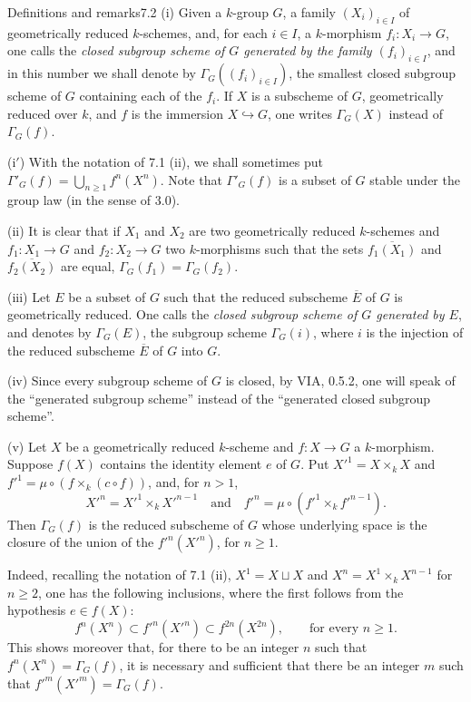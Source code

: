 \begin{enoncerm}{Definitions and remarks}{7.2}\label{VIB.7.2}
(i) Given a $k$-group $G$, a family $(X_i)_{i\in I}$ of geometrically reduced $k$-schemes, and, for each $i\in I$, a $k$-morphism $f_i:X_i\to G$, one calls the \emph{closed subgroup scheme of $G$ generated by the family $(f_i)_{i\in I}$}, and in this number we shall denote by $\Gamma_G((f_i)_{i\in I})$, the smallest closed subgroup scheme of $G$ containing each of the $f_i$. If $X$ is a subscheme of $G$, geometrically reduced over $k$, and $f$ is the immersion $X\hookrightarrow G$, one writes $\Gamma_G(X)$ instead of $\Gamma_G(f)$.

(i$'$) With the notation of 7.1 (ii), we shall sometimes put $\Gamma'_G(f)=\bigcup_{n\ge1}f^n(X^n)$. Note that $\Gamma'_G(f)$ is a subset of $G$ stable under the group law (in the sense of 3.0).

(ii) It is clear that if $X_1$ and $X_2$ are two geometrically reduced $k$-schemes and $f_1:X_1\to G$ and $f_2:X_2\to G$ two $k$-morphisms such that the sets $\overline{f_1(X_1)}$ and $\overline{f_2(X_2)}$ are equal, $\Gamma_G(f_1)=\Gamma_G(f_2)$.

(iii) Let $E$ be a subset of $G$ such that the reduced subscheme $\overline E$ of $G$ is geometrically reduced. One calls the \emph{closed subgroup scheme of $G$ generated by $E$}, and denotes by $\Gamma_G(E)$, the subgroup scheme $\Gamma_G(i)$, where $i$ is the injection of the reduced subscheme $\overline E$ of $G$ into $G$.

(iv) Since every subgroup scheme of $G$ is closed, by VIA, 0.5.2, one will speak of the ``generated subgroup scheme'' instead of the ``generated closed subgroup scheme''.

(v) Let $X$ be a geometrically reduced $k$-scheme and $f:X\to G$ a $k$-morphism. Suppose $f(X)$ contains the identity element $e$ of $G$. Put $X'^1=X\times_kX$ and $f'^1=\mu\circ(f\times_k(c\circ f))$, and, for $n>1$,
\[
X'^n=X'^1\times_kX'^{n-1}\quad\text{and}\quad f'^n=\mu\circ(f'^1\times_kf'^{n-1}).
\]
Then $\Gamma_G(f)$ is the reduced subscheme of $G$ whose underlying space is the closure of the union of the $f'^n(X'^n)$, for $n\ge1$.

Indeed, recalling the notation of 7.1 (ii), $X^1=X\sqcup X$ and $X^n=X^1\times_kX^{n-1}$ for $n\ge2$, one has the following inclusions, where the first follows from the hypothesis $e\in f(X)$:
\[
f^n(X^n)\subset f'^n(X'^n)\subset f^{2n}(X^{2n}),\qquad\text{for every }n\ge1.
\]
This shows moreover that, for there to be an integer $n$ such that $f^n(X^n)=\Gamma_G(f)$, it is necessary and sufficient that there be an integer $m$ such that $f'^m(X'^m)=\Gamma_G(f)$.
\end{enoncerm}
